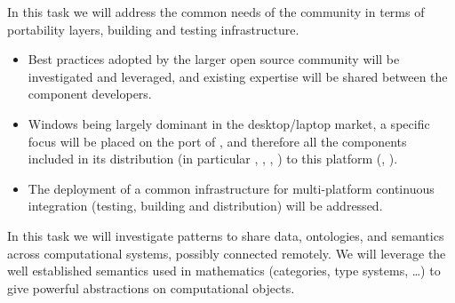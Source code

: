 \begin{workpackage}[id=component-architecture,wphases=3-24!.5,
  title=Component Architecture,lead=UV,
  PSRM=24,UVRM=1,SARM=1, USHRM=4]
\begin{tasklist}
\begin{task}[id=portability,title=Portability]
    In this task we will address the common needs of the community in
    terms of portability layers, building and testing infrastructure.

    \begin{itemize}
    \item Best practices adopted by the larger open source community
      will be investigated and leveraged, and existing expertise will
      be shared between the component developers.
    \item Windows being largely dominant in the desktop/laptop market,
      a specific focus will be placed on the port of \Sage, and
      therefore all the components included in its distribution (in
      particular \PariGP, \GAP, \Singular, \Linbox) to this platform
      (, ).
    \item The deployment of a common infrastructure for multi-platform
      continuous integration (testing, building and distribution) will
      be addressed.
    \end{itemize}

  \end{task}

  \begin{task}[title=Interfaces between systems,id=interface-systems]
    In this task we will investigate patterns to share data,
    ontologies, and semantics across computational systems, possibly
    connected remotely.  We will leverage the well established
    semantics used in mathematics (categories, type systems, \dots) to
    give powerful abstractions on computational objects.
    

\end{task}
\end{tasklist}
\end{workpackage}
